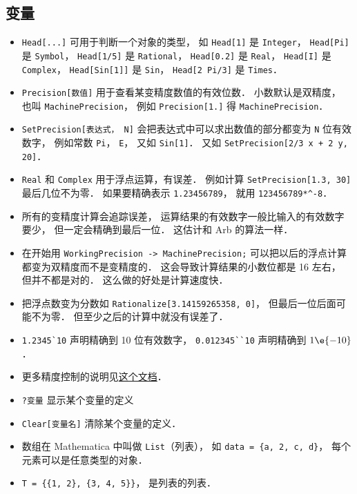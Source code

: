 \subsection{变量}
\begin{itemize}
\item \verb|Head[...]| 可用于判断一个对象的类型， 如 \verb|Head[1]| 是 \verb|Integer|， \verb|Head[Pi]| 是 \verb|Symbol|， \verb|Head[1/5]| 是 \verb|Rational|， \verb|Head[0.2]| 是 \verb|Real|， \verb|Head[I]| 是 \verb|Complex|， \verb|Head[Sin[1]]|  是 \verb|Sin|， \verb|Head[2 Pi/3]| 是 \verb|Times|．
\item \verb|Precision[数值]| 用于查看某变精度数值的有效位数． 小数默认是双精度， 也叫 \verb|MachinePrecision|， 例如 \verb|Precision[1.]| 得 \verb|MachinePrecision|．
\item \verb|SetPrecision[表达式， N]| 会把表达式中可以求出数值的部分都变为 \verb|N| 位有效数字， 例如常数 \verb|Pi|， \verb|E|， 又如 \verb|Sin[1]|． 又如 \verb|SetPrecision[2/3 x + 2 y, 20]|．
\item \verb|Real| 和 \verb|Complex| 用于浮点运算，有误差． 例如计算 \verb|SetPrecision[1.3, 30]| 最后几位不为零． 如果要精确表示 \verb|1.23456789|， 就用 \verb|123456789*^-8|．
\item 所有的变精度计算会追踪误差， 运算结果的有效数字一般比输入的有效数字要少， 但一定会精确到最后一位． 这估计和 Arb 的算法一样．
\item 在开始用 \verb|WorkingPrecision -> MachinePrecision;| 可以把以后的浮点计算都变为双精度而不是变精度的． 这会导致计算结果的小数位都是 16 左右， 但并不都是对的． 这么做的好处是计算速度快．
\item 把浮点数变为分数如 \verb|Rationalize[3.14159265358, 0]|， 但最后一位后面可能不为零． 但至少之后的计算中就没有误差了．
\item \verb|1.2345`10| 声明精确到 10 位有效数字， \verb|0.012345``10| 声明精确到 $1\e{-10}$．
\item 更多精度控制的说明见\href{https://reference.wolfram.com/language/howto/ControlThePrecisionAndAccuracyOfNumericalResults.html}{这个文档}．
\item \verb|?变量| 显示某个变量的定义
\item \verb|Clear[变量名]| 清除某个变量的定义．
\item 数组在 Mathematica 中叫做 \verb|List|（列表）， 如 \verb|data = {a, 2, c, d}|， 每个元素可以是任意类型的对象．
\item \verb|T = {{1, 2}, {3, 4, 5}}|， 是列表的列表．
\end{itemize}


